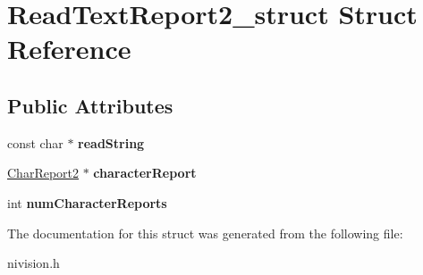 \hypertarget{structReadTextReport2__struct}{\section{\-Read\-Text\-Report2\-\_\-struct \-Struct \-Reference}
\label{structReadTextReport2__struct}
}
\subsection*{\-Public \-Attributes}
\begin{DoxyCompactItemize}
\item 
\hypertarget{structReadTextReport2__struct_ad96b2d2abe2e6bbe84aabba46f136c71}{const char $\ast$ {\bfseries read\-String}}\label{structReadTextReport2__struct_ad96b2d2abe2e6bbe84aabba46f136c71}

\item 
\hypertarget{structReadTextReport2__struct_af4076e01608522851c0215d2d4373221}{\hyperlink{structCharReport2__struct}{\-Char\-Report2} $\ast$ {\bfseries character\-Report}}\label{structReadTextReport2__struct_af4076e01608522851c0215d2d4373221}

\item 
\hypertarget{structReadTextReport2__struct_ac5c5ff5bc27c0a66f6bfc3a73eff10d9}{int {\bfseries num\-Character\-Reports}}\label{structReadTextReport2__struct_ac5c5ff5bc27c0a66f6bfc3a73eff10d9}

\end{DoxyCompactItemize}


\-The documentation for this struct was generated from the following file\-:\begin{DoxyCompactItemize}
\item 
nivision.\-h\end{DoxyCompactItemize}
